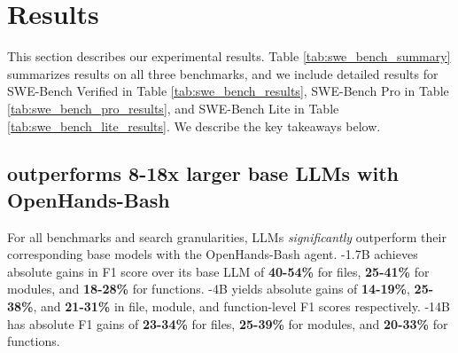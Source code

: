 

\section{Results}\label{sec:results}

This section describes our experimental results. Table \ref{tab:swe_bench_summary} summarizes results on all three benchmarks, and we include detailed results for SWE-Bench Verified in Table \ref{tab:swe_bench_results}, SWE-Bench Pro in Table \ref{tab:swe_bench_pro_results}, and SWE-Bench Lite in Table \ref{tab:swe_bench_lite_results}. We describe the key takeaways below. 
\subsection{\methodname outperforms \textbf{8-18x} larger base LLMs with OpenHands-Bash}\label{sec:oh_bash_base}
For all benchmarks and search granularities, \methodname LLMs \emph{significantly} outperform their corresponding base models with the OpenHands-Bash agent. \methodname-1.7B achieves absolute gains in F1 score over its base LLM of \textbf{40-54\%} for files, \textbf{25-41\%} for modules, and \textbf{18-28\%} for functions. \methodname-4B yields absolute gains of \textbf{14-19\%}, \textbf{25-38\%}, and \textbf{21-31\%} in file, module, and function-level F1 scores respectively. \methodname-14B has absolute F1 gains of \textbf{23-34\%} for files, \textbf{25-39\%} for modules, and \textbf{20-33\%} for functions.

